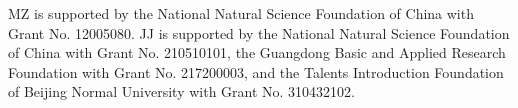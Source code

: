 \documentclass[a4paper,11pt]{article}
\begin{document}
\acknowledgments
 MZ is supported by the National Natural Science Foundation of China with Grant No. 12005080.  JJ  is supported by the National Natural Science Foundation of China with Grant No. 210510101, the Guangdong Basic and Applied Research Foundation with Grant No. 217200003, and the Talents Introduction Foundation of Beijing Normal University with Grant No. 310432102.








\end{document}
